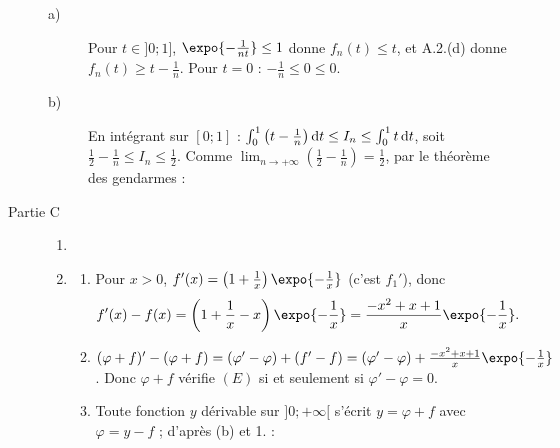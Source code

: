 \begin{description}
\begin{description}
		\item[a)] 
			Pour $t \in ]0;1]$, $\expo{-\frac{1}{nt}} \leq 1$ donne $f_n(t) \leq t$, et A.2.(d) donne $f_n(t) \geq t - \frac{1}{n}$.
			Pour $t = 0$ : $-\frac{1}{n} \leq 0 \leq 0$.
			\par\noindent{}
		\item[b)] 
			En intégrant sur $[0;1]$ : $\int_0^1 \left(t - \frac{1}{n}\right)\mathrm{d}t \leq I_n \leq \int_0^1 t\,\mathrm{d}t$, soit
			$\frac{1}{2} - \frac{1}{n} \leq I_n \leq \frac{1}{2}$.
			Comme $\lim_{n\to+\infty}\left(\frac{1}{2} - \frac{1}{n}\right) = \frac{1}{2}$, par le théorème des gendarmes :
			\par\noindent{}
	\end{description}
	\item[Partie C]
	\begin{enumerate}
		\item {}
		\item
		\begin{enumerate}
			\item {}
				Pour $x > 0$, $f'(x) = \left(1 + \frac{1}{x}\right)\expo{-\frac{1}{x}}$ (c'est $f_1'$), donc
				\[
					f'(x) - f(x) = \left(1 + \frac{1}{x} - x\right)\expo{-\frac{1}{x}} = \frac{-x^2 + x + 1}{x}\expo{-\frac{1}{x}} .
				\]
				\par\noindent\ansbox{$f$ est solution de $(E)$ sur $]0;+\infty[$.}
			\item {}
				$(\varphi + f)' - (\varphi + f) = (\varphi' - \varphi) + (f' - f) = (\varphi' - \varphi) + \frac{-x^2+x+1}{x}\expo{-\frac{1}{x}}$.
				Donc $\varphi + f$ vérifie $(E)$ si et seulement si $\varphi' - \varphi = 0$.
				\par\noindent{}
			\item {}
				Toute fonction $y$ dérivable sur $]0;+\infty[$ s'écrit $y = \varphi + f$ avec $\varphi = y - f$ ; d'après (b) et 1. :
				\par\noindent\ansbox{les solutions de $(E)$ sur $]0;+\infty[$ sont $x \mapsto C\expo{x} + x\expo{-\frac{1}{x}}$, $C \in \mathbb{R}$.}
		\end{enumerate}
	\end{enumerate}
\end{description}
